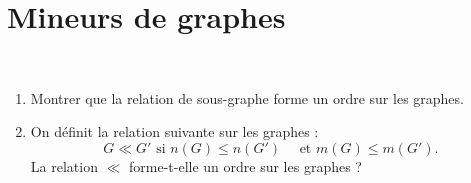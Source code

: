 \section{Mineurs de graphes}\label{sec:mineurs-de-graphes}

\begin{td-exo}\, %
    \begin{enumerate}
        \item Montrer que la relation de sous-graphe forme un ordre sur les graphes.
        \item On d\'efinit la relation suivante sur les graphes :
        \begin{equation*}
            G \ll G' \text{ si } n(G) \leq n(G') \quad\text{ et } m(G) \leq m(G').
        \end{equation*}
        La relation \(\ll\) forme-t-elle un ordre sur les graphes ?
    \end{enumerate}
\end{td-exo}

